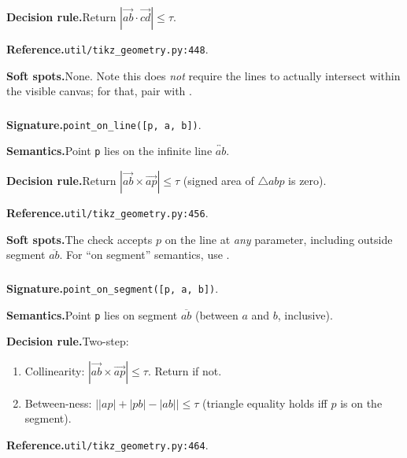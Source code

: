\noindent\textbf{Decision rule.}\quad Return $|\vec{ab}\cdot\vec{cd}| \leq \tau$.

\noindent\textbf{Reference.}\quad \texttt{util/tikz\_geometry.py:448}.

\noindent\textbf{Soft spots.}\quad None.
Note this does \emph{not} require the lines to actually intersect within the visible canvas; for that, pair with .

\subsubsection{}
\label{app:pred:point_on_line}

\noindent\textbf{Signature.}\quad \texttt{point\_on\_line([p, a, b])}.

\noindent\textbf{Semantics.}\quad Point \texttt{p} lies on the infinite line $\overleftrightarrow{ab}$.

\noindent\textbf{Decision rule.}\quad Return $|\vec{ab}\times\vec{ap}| \leq \tau$ (signed area of $\triangle abp$ is zero).

\noindent\textbf{Reference.}\quad \texttt{util/tikz\_geometry.py:456}.

\noindent\textbf{Soft spots.}\quad The check accepts $p$ on the line at \emph{any} parameter, including outside segment $\overline{ab}$.
For ``on segment'' semantics, use .

\subsubsection{}
\label{app:pred:point_on_segment}

\noindent\textbf{Signature.}\quad \texttt{point\_on\_segment([p, a, b])}.

\noindent\textbf{Semantics.}\quad Point \texttt{p} lies on segment $\overline{ab}$ (between $a$ and $b$, inclusive).

\noindent\textbf{Decision rule.}\quad Two-step:
\begin{enumerate}
\item Collinearity: $|\vec{ab}\times\vec{ap}| \leq \tau$. Return \false if not.
\item Between-ness: $\big||ap| + |pb| - |ab|\big| \leq \tau$ (triangle equality holds iff $p$ is on the segment).
\end{enumerate}

\noindent\textbf{Reference.}\quad \texttt{util/tikz\_geometry.py:464}.

